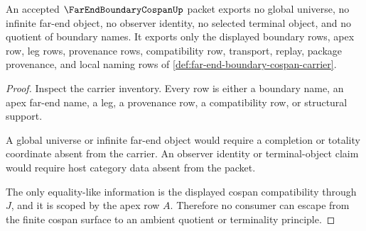 \begin{theorem}
\label{thm:far-end-boundary-cospan-nonescape}
An accepted $\FarEndBoundaryCospanUp$ packet exports no global universe, no infinite far-end object, no observer identity, no selected terminal object, and no quotient of boundary names. It exports only the displayed boundary rows, apex row, leg rows, provenance rows, compatibility row, transport, replay, package provenance, and local naming rows of \autoref{def:far-end-boundary-cospan-carrier}.
\end{theorem}
\begin{proof}
Inspect the carrier inventory. Every row is either a boundary name, an apex far-end name, a leg, a provenance row, a compatibility row, or structural support.

A global universe or infinite far-end object would require a completion or totality coordinate absent from the carrier. An observer identity or terminal-object claim would require host category data absent from the packet.

The only equality-like information is the displayed cospan compatibility through $J$, and it is scoped by the apex row $A$. Therefore no consumer can escape from the finite cospan surface to an ambient quotient or terminality principle.
\end{proof}




